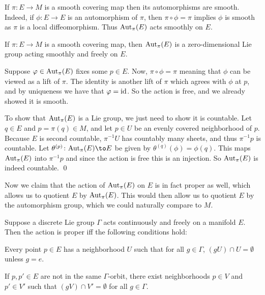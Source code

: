 \edefn

If $\pi\colon E\to M$ is a smooth covering map then its automorphisms are smooth.
Indeed, if $\phi\colon E\to E$ is an automorphism of $\pi$, then $\pi\circ\phi=\pi$ implies $\phi$ is smooth as $\pi$
is a local diffeomorphism.
Thus ${\rm Aut}_\pi(E)$ acts smoothly on $E$.

\blemm

    If $\pi\colon E\to M$ is a smooth covering map, then ${\rm Aut}_\pi(E)$ is a zero-dimensional Lie group acting smoothly
    and freely on $E$.

\elemm

\bproof

    Suppose $\varphi\in{\rm Aut}_\pi(E)$ fixes some $p\in E$.
    Now, $\pi\circ\phi=\pi$ meaning that $\phi$ can be viewed as a lift of $\pi$.
    The identity is another lift of $\pi$ which agrees with $\phi$ at $p$, and by uniqueness we have that $\varphi={\rm id}$.
    So the action is free, and we already showed it is smooth.

    To show that ${\rm Aut}_\pi(E)$ is a Lie group, we just need to show it is countable.
    Let $q\in E$ and $p=\pi(q)\in M$, and let $p\in U$ be an evenly covered neighborhood of $p$.
    Because $E$ is second countable, $\pi^{-1}U$ has countably many sheets, and thus $\pi^{-1}p$ is countable.
    Let $\theta^{(p)}\colon\aut_\pi(E)\to E$ be given by $\theta^{(q)}(\phi)=\phi(q)$.
    This maps ${\rm Aut}_\pi(E)$ into $\pi^{-1}p$ and since the action is free this is an injection.
    So ${\rm Aut}_\pi(E)$ is indeed countable.
    \qed

\eproof

Now we claim that the action of ${\rm Aut}_\pi(E)$ on $E$ is in fact proper as well, which allows us to quotient $E$ by ${\rm Aut}_\pi(E)$.
This would then allow us to quotient $E$ by the automorphism group, which we could naturally compare to $M$.

\blemm

    Suppose a discrete Lie group $\Gamma$ acts continuously and freely on a manifold $E$.
    Then the action is proper iff the following conditions hold:
    \benum
        \item Every point $p\in E$ has a neighborhood $U$ such that for all $g\in\Gamma$, $(gU)\cap U=\emptyset$ unless $g=e$.
        \item If $p,p'\in E$ are not in the same $\Gamma$-orbit, there exist neighborhoods $p\in V$ and $p'\in V'$ such that
        $(gV)\cap V'=\emptyset$ for all $g\in\Gamma$.
    \eenum

\elemm


